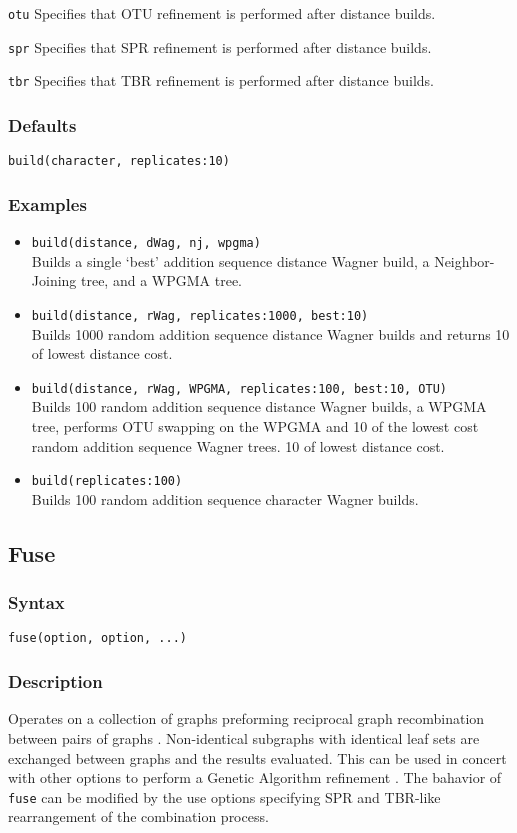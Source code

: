 \documentclass[11pt]{article}
\begin{document}
		\smallskip		
		\noindent \texttt{otu} Specifies that OTU refinement \citep{Wheeler2021} is performed after distance builds.
		
		\smallskip		
		\noindent \texttt{spr} Specifies that SPR refinement \citep{Dayhoff1969} is performed after distance builds.

		\smallskip		
		\noindent \texttt{tbr} Specifies that TBR refinement \citep{Farris1988, swofford1990a} is performed after distance builds.

		\subsubsection{Defaults}
			\texttt{build(character, replicates:10)}
		\subsubsection{Examples}
			\begin{itemize}
				\item{\texttt{build(distance, dWag, nj, wpgma)}\\Builds a single `best' addition sequence distance Wagner build, a Neighbor-Joining tree, and a WPGMA tree.}
				\item{\texttt{build(distance, rWag, replicates:1000, best:10)}\\Builds 1000 random addition sequence distance Wagner builds and returns  
				10 of lowest distance cost.}
				\item{\texttt{build(distance, rWag, WPGMA, replicates:100, best:10, OTU)} \\Builds 100 random addition sequence  distance Wagner builds, a WPGMA tree, performs OTU swapping on the WPGMA and 10 of the lowest cost random addition sequence Wagner trees. 
				10 of lowest distance cost.}
				\item{\texttt{build(replicates:100)} \\Builds 100 random addition sequence  character Wagner builds.}
			\end{itemize}
	
	\subsection{Fuse}
		\subsubsection{Syntax}
		\texttt{fuse(option, option, ...)}
		
		\subsubsection{Description}
		Operates on a collection of graphs preforming reciprocal graph recombination between pairs of graphs \citep{moilanen1999, moilanen2001, goloboff1999}.  Non-identical subgraphs with identical leaf sets are
		exchanged between graphs and the results evaluated.  This can be  used in concert with other options  to perform a Genetic Algorithm refinement \citep{Holland1975}.  The bahavior of \texttt{fuse} can be modified by the use options specifying  SPR and TBR-like rearrangement of the combination process.
\end{document}
